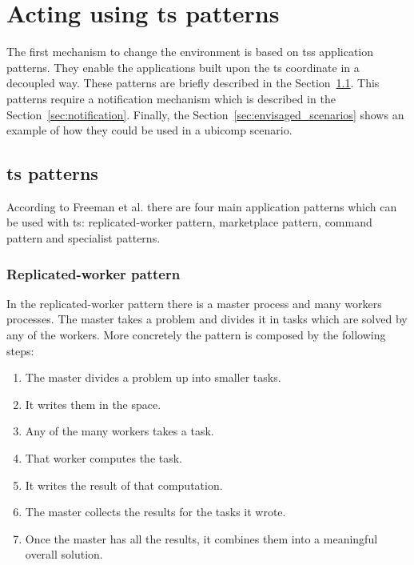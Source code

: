 
\section{Acting using \ac{ts} patterns}

The first mechanism to change the environment is based on \acp{ts} application patterns.
They enable the applications built upon the \ac{ts} coordinate in a decoupled way.
These patterns are briefly described in the Section~\ref{sec:ts_patterns}.
This patterns require a notification mechanism which is described in the Section~\ref{sec:notification}.
Finally, the Section~\ref{sec:envisaged_scenarios} shows an example of how they could be used in a \ac{ubicomp} scenario.


\subsection{\ac{ts} patterns}
\label{sec:ts_patterns}

According to Freeman et al. \cite{freeman_javaspaces_1999} there are four main application patterns which can be used with \ac{ts}:
replicated-worker pattern, marketplace pattern, command pattern and specialist patterns.


\subsubsection{Replicated-worker pattern}

In the replicated-worker pattern there is a master process and many workers processes.
The master takes a problem and divides it in tasks which are solved by any of the workers.
More concretely the pattern is composed by the following steps:

\begin{enumerate}
  \item The master divides a problem up into smaller tasks.
  \item It writes them in the space.
  \item Any of the many workers takes a task.
  \item That worker computes the task.
  \item It writes the result of that computation.
  \item The master collects the results for the tasks it wrote.
  \item Once the master has all the results, it combines them into a meaningful overall solution.
\end{enumerate}

